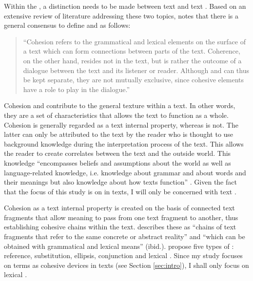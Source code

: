 \documentclass[output=paper]{langsci/langscibook.cls}
\begin{document}
Within the , a distinction needs to be made between text  
and text . Based on an extensive review of literature addressing these 
two topics, \citet[7]{Tanskanen2006} notes that there is a general consensus to define 
 and  as follows: 

\begin{quote}
``Cohesion refers to the grammatical and lexical elements on the surface of a text 
which can form connections between parts of the text. Coherence, on the other hand, 
resides not in the text, but is rather the outcome of a dialogue between the text 
and its listener or reader. Although  and  can thus be kept separate, 
they are not mutually exclusive, since cohesive elements have a role to play in 
the dialogue.''
\end{quote}

Cohesion and  contribute to the general texture within a text. In other words, they are a 
set of characteristics that allows the text to function as a whole. Cohesion is 
generally regarded as a text internal property, whereas  is not. The latter 
can only be attributed to the text by the reader who is thought to use background 
knowledge during the interpretation process of the text. This allows the reader 
to create correlates between the text and the outside world. This knowledge ``encompasses 
beliefs and assumptions about the world as well as language-related knowledge, 
i.e. knowledge about grammar and about words and their meanings but also knowledge 
about how texts function'' \citep[104]{Collet2004}. Given the fact that the focus of 
this study is on  in texts, I will only be concerned with 
text .

Cohesion as a text internal property is created on the basis of connected text fragments that allow meaning to pass from one text fragment to another, thus establishing 
cohesive chains within the text. \citet{Collet2004} describes these as ``chains of text fragments that refer to 
the same concrete or abstract reality'' and ``which can be obtained with grammatical 
and lexical means'' (ibid.). \citet{HallidayHasan1976} propose five types of : 
reference, substitution, ellipsis, conjunction and lexical . Since my study focuses on terms as cohesive devices in texts (see Section \ref{sec:intro}), I shall only 
focus on lexical . 
\end{document}
